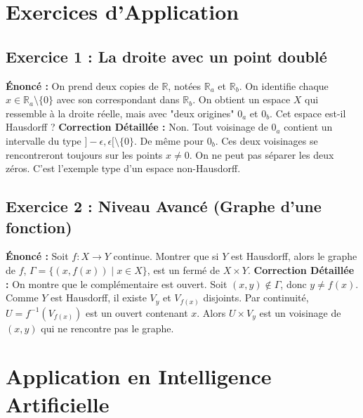 \documentclass[11pt,a4paper]{article}
\begin{document}
\section{Exercices d'Application}

\subsection{Exercice 1 : La droite avec un point doublé}
\textbf{Énoncé :} On prend deux copies de $\mathbb{R}$, notées $\mathbb{R}_a$ et $\mathbb{R}_b$. On identifie chaque $x \in \mathbb{R}_a \setminus \{0\}$ avec son correspondant dans $\mathbb{R}_b$. On obtient un espace $X$ qui ressemble à la droite réelle, mais avec "deux origines" $0_a$ et $0_b$. Cet espace est-il Hausdorff ?
\textbf{Correction Détaillée :}
Non. Tout voisinage de $0_a$ contient un intervalle du type $]-\epsilon, \epsilon[ \setminus \{0\}$. De même pour $0_b$. Ces deux voisinages se rencontreront toujours sur les points $x \neq 0$. On ne peut pas séparer les deux zéros. C'est l'exemple type d'un espace non-Hausdorff.

\subsection{Exercice 2 : Niveau Avancé (Graphe d'une fonction)}
\textbf{Énoncé :} Soit $f : X \to Y$ continue. Montrer que si $Y$ est Hausdorff, alors le graphe de $f$, $\Gamma = \{ (x, f(x)) \mid x \in X \}$, est un fermé de $X \times Y$.
\textbf{Correction Détaillée :}
On montre que le complémentaire est ouvert. Soit $(x, y) \notin \Gamma$, donc $y \neq f(x)$. Comme $Y$ est Hausdorff, il existe $V_y$ et $V_{f(x)}$ disjoints. Par continuité, $U = f^{-1}(V_{f(x)})$ est un ouvert contenant $x$. Alors $U \times V_y$ est un voisinage de $(x, y)$ qui ne rencontre pas le graphe.

\section{Application en Intelligence Artificielle}
\end{document}
